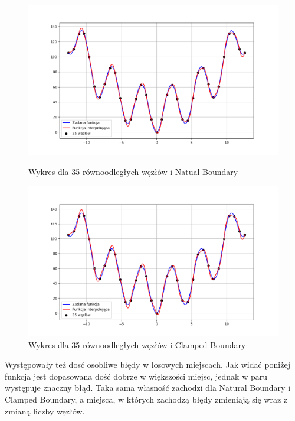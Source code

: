 \documentclass{article}
\begin{document}
\begin{figure}[H]
  \begin{minipage}[b]{0.49\textwidth}
    \includegraphics[width=\textwidth]{img19_n=35.png}
    \caption{Wykres dla 35 równoodległych węzłów i Natual Boundary}
  \end{minipage}
  \hfill
  \begin{minipage}[b]{0.49\textwidth}
    \includegraphics[width=\textwidth]{img20_n=35.png}
    \caption{Wykres dla 35 równoodległych węzłów i Clamped Boundary}
  \end{minipage}
\end{figure}

\newpage

Występowały też dosć osobliwe błędy w losowych miejscach. Jak widać poniżej funkcja jest dopasowana dość dobrze w większości miejsc, jednak w paru występuje znaczny błąd. Taka sama własność zachodzi dla Natural Boundary i Clamped Boundary, a miejsca, w których zachodzą błędy zmieniają się wraz z zmianą liczby węzłów.
\end{document}
